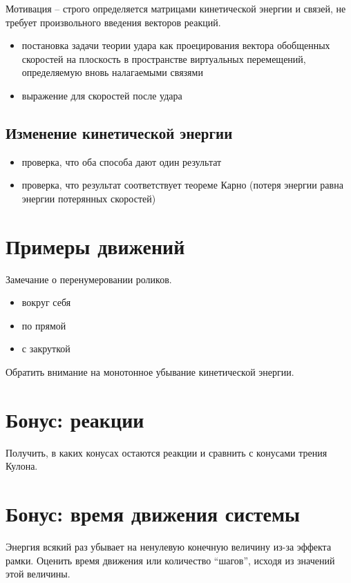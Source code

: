 Мотивация -- строго определяется матрицами кинетической энергии и связей, не требует произвольного введения векторов реакций.

\begin{itemize}
    \item постановка задачи теории удара как проецирования вектора обобщенных скоростей на плоскость в пространстве виртуальных перемещений, определяемую вновь налагаемыми связями
    \item выражение для скоростей после удара
\end{itemize}

\subsection{Изменение кинетической энергии}

\begin{itemize}
    \item проверка, что оба способа дают один результат
    \item проверка, что результат соответствует теореме Карно (потеря энергии равна энергии потерянных скоростей)
\end{itemize}

\section{Примеры движений}

Замечание о перенумеровании роликов.
\begin{itemize}
    \item вокруг себя
    \item по прямой
    \item с закруткой
\end{itemize}

Обратить внимание на монотонное убывание кинетической энергии.

\section{Бонус: реакции}

Получить, в каких конусах остаются реакции и сравнить с конусами трения Кулона.

\section{Бонус: время движения системы}

Энергия всякий раз убывает на ненулевую конечную величину из-за эффекта рамки. Оценить время движения или количество ``шагов'', исходя из значений этой величины.
